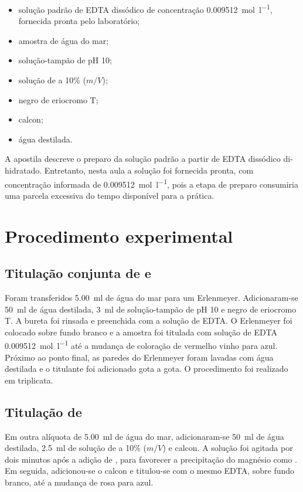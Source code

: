 \documentclass[a4paper,12pt]{article}
\newcommand{\ConcEDTA}{0.009512}
\newcommand{\VolAmostra}{5.00}
\begin{document}
\begin{itemize}
  \item solução padrão de EDTA dissódico de concentração
        \qty{\ConcEDTA}{\mole\per\litre}, fornecida pronta pelo laboratório;
  \item amostra de água do mar;
  \item solução-tampão de pH 10;
  \item solução de  a 10\% ($m/V$);
  \item negro de eriocromo T;
  \item calcon;
  \item água destilada.
\end{itemize}

A apostila descreve o preparo da solução padrão a partir de EDTA dissódico
di-hidratado. Entretanto, nesta aula a solução foi fornecida pronta, com
concentração informada de \qty{\ConcEDTA}{\mole\per\litre}, pois a etapa de
preparo consumiria uma parcela excessiva do tempo disponível para a prática.

\section{Procedimento experimental}

\subsection{Titulação conjunta de  e }

Foram transferidos \qty{\VolAmostra}{\milli\litre} de água do mar para um
Erlenmeyer. Adicionaram-se \qty{50}{\milli\litre} de água destilada,
\qty{3}{\milli\litre} de solução-tampão de pH 10 e negro de eriocromo T.
A bureta foi rinsada e preenchida com a solução de EDTA. O Erlenmeyer foi
colocado sobre fundo branco e a amostra foi titulada com solução de EDTA
\qty{\ConcEDTA}{\mole\per\litre} até a mudança de coloração de vermelho
vinho para azul. Próximo ao ponto final, as paredes do Erlenmeyer foram
lavadas com água destilada e o titulante foi adicionado gota a gota. O
procedimento foi realizado em triplicata.

\subsection{Titulação de }

Em outra alíquota de \qty{\VolAmostra}{\milli\litre} de água do mar,
adicionaram-se \qty{50}{\milli\litre} de água destilada,
\qty{2.5}{\milli\litre} de solução de  a 10\% ($m/V$) e calcon.
A solução foi agitada por dois minutos após a adição de , para
favorecer a precipitação do magnésio como . Em seguida,
adicionou-se o calcon e titulou-se com o mesmo EDTA, sobre fundo branco, até
a mudança de rosa para azul.
\end{document}
